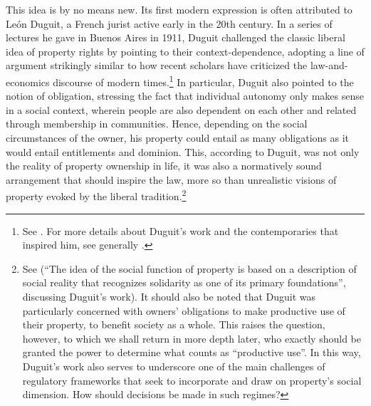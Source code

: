 This idea is by no means new. Its first modern expression is often attributed to Le{\'o}n Duguit, a French jurist active early in the 20th century. In a series of lectures he gave in Buenos Aires in 1911, Duguit challenged the classic liberal idea of property rights by pointing to their context-dependence, adopting a line of argument strikingly similar to how recent scholars have criticized the law-and-economics discourse of modern times.\footnote{See \cite[1004-1008]{forster11}. For more details about Duguit's work and the contemporaries that inspired him, see generally \cite{mirow10}.} In particular, Duguit also pointed to the notion of obligation, stressing the fact that individual autonomy only makes sense in a social context, wherein people are also dependent on each other and related through membership in communities. Hence, depending on the social circumstances of the owner, his property could entail as many obligations as it would entail entitlements and dominion. This, according to Duguit, was not only the reality of property ownership in life, it was also a normatively sound arrangement that should inspire the law, more so than unrealistic visions of property evoked by the liberal tradition.\footnote{See \cite[1005]{forster11} (``The idea of the social function of property is based on a description of social reality that recognizes solidarity as one of its primary foundations'', discussing Duguit's work). It should also be noted that Duguit was particularly concerned with owners' obligations to make productive use of their property, to benefit society as a whole. This raises the question, however, to which we shall return in more depth later, who exactly should be granted the power to determine what counts as ``productive use''. In this way, Duguit's work also serves to underscore one of the main challenges of regulatory frameworks that seek to incorporate and draw on property's social dimension. How should decisions be made in such regimes?} 

